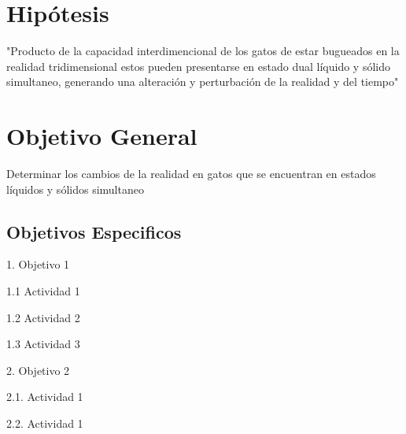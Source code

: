 \titleformat{\chapter}[display]
  {\normalfont\bfseries}{}{0pt}{\Huge}
\titlespacing{\chapter}{0pt}{0cm}{2pt}
\titleformat{\section}[display]
  {\normalfont\bfseries}{}{0pt}{\Large}
\titlespacing{\section}{0pt}{0cm}{1pt}
\titleformat{\subsection}[display]
  {\normalfont\bfseries}{}{0pt}{\large}
\titlespacing{\subsection}{0pt}{0cm}{1pt}

\chapter{Hipótesis}
\lipsum[36]

"Producto de la capacidad interdimencional de los gatos de estar bugueados en la realidad tridimensional estos pueden presentarse en estado dual líquido y sólido simultaneo, generando una alteración y perturbación de la realidad y del tiempo"

{\let\clearpage\relax\chapter{Objetivo General}}
Determinar los cambios de la realidad en gatos que se encuentran en estados líquidos y sólidos simultaneo 

\section{Objetivos Especificos}

1. Objetivo 1 \par
\setlength{\parindent}{35pt}
1.1 Actividad 1 \par
1.2 Actividad 2 \par
1.3 Actividad 3 \par
\setlength{\parindent}{20pt}
2. Objetivo 2 \par
\setlength{\parindent}{35pt}
2.1. Actividad 1 \par
2.2. Actividad 1 \par

